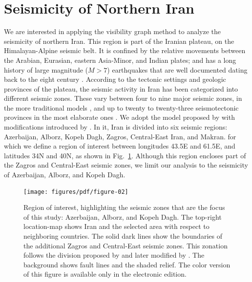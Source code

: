 
\section{Seismicity of Northern Iran}
\label{sec:seismicity}

We are interested in applying the visibility graph method to analyze the seismicity of northern Iran. This region is part of the Iranian plateau, on the Himalayan-Alpine seismic belt. It is confined by the relative movements between the Arabian, Eurasian, eastern Asia-Minor, and Indian plates; and has a long history of large magnitude ($M>7$) earthquakes that are well documented dating back to the eight century \citep[e.g.,][]{Berberian_1981_Chap}. According to the tectonic settings and geologic provinces of the plateau, the seismic activity in Iran has been categorized into different seismic zones. These vary between four to nine major seismic zones, in the more traditional models \citep[e.g.,][]{Stocklin1968, Takin1972, Berberian1976}, and up to twenty to twenty-three seismotectonic provinces in the most elaborate ones \citep[e.g.,][]{Nowroozi1976, Tavakoli1999}. We adopt the model proposed by \citet{Mirzaei1998} with modifications introduced by \citet{Karimiparidari2013}. In it, Iran is divided into six seismic regions: Azerbaijan, Alborz, Kopeh Dagh, Zagros, Central-East Iran, and Makran.  for which we define a region of interest between longitudes 43.5\textdegree{}E and 61.5\textdegree{}E, and latitudes 34\textdegree{}N and 40\textdegree{}N, as shown in Fig.~\ref{fig:study_region}. Although this region encloses part of the Zagros and Central-East seismic zones, we limit our analysis to the seismicity of Azerbaijan, Alborz, and Kopeh Dagh.

\begin{figure}[t]
	\centering
	\texttt{[image: figures/pdf/figure-02]} 
	\caption{Region of interest, highlighting the seismic zones that are the focus of this study: Azerbaijan, Alborz, and Kopeh Dagh. The top-right location-map shows Iran and the selected area with respect to neighboring countries. The solid dark lines show the boundaries of the additional Zagros and Central-East seismic zones. This zonation follows the division proposed by \citet{Mirzaei1998} and later modified by \citet{Karimiparidari2013}. The background shows fault lines and the shaded relief. The color version of this figure is available only in the electronic edition.}
	\label{fig:study_region}
\end{figure}

